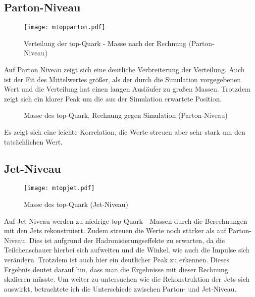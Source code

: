 \documentclass[
a4paper,                                %
twoside,                                %
BCOR1.4cm,                      %
ngerman,                                %
10pt,                           %
headings=normal,                %
headsepline,                    %
clearplainpage, %
final,                                  %
div=14,
parskip=full
]{scrbook}
\begin{document}
\newpage

\subsection{Parton-Niveau}

\begin{figure}[h]
	\centering
	\texttt{[image: mtopparton.pdf]}
	\caption{Verteilung der top-Quark - Masse nach der Rechnung (Parton-Niveau)}
\end{figure}

Auf Parton Niveau zeigt sich eine deutliche Verbreiterung der Verteilung. Auch ist der Fit des Mittelwertes gr\"o\ss er, als der durch die Simulation vorgegebenen Wert und die Verteilung hat einen langen Ausl\"aufer zu gro\ss en Massen. Trotzdem zeigt sich ein klarer Peak um die aus der Simulation erwartete Position.

\begin{figure}[h]
    \caption{Masse des top-Quark, Rechnung gegen Simulation (Parton-Niveau)}
    \label{topmassepartonhist}
\end{figure}

Es zeigt sich eine leichte Korrelation, die Werte streuen aber sehr stark um den tats\"achlichen Wert.

\newpage

\subsection{Jet-Niveau}

\begin{figure}[h]
	\centering
    \texttt{[image: mtopjet.pdf]}
    \caption{Masse des top-Quark (Jet-Niveau)}
    \label{topmassejethist}
\end{figure}

Auf Jet-Niveau werden zu niedrige top-Quark - Massen durch die Berechnungen mit den Jets rekonstruiert. Zudem streuen die Werte noch st\"arker als auf Parton-Niveau. Dies ist aufgrund der Hadronisierungseffekte zu erwarten, da die Teilchenschauer hierbei sich aufweiten und die Winkel, wie auch die Impulse sich ver\"andern. Trotzdem ist auch hier ein deutlicher Peak zu erkennen. Dieses Ergebnis deutet darauf hin, dass man die Ergebnisse mit dieser Rechnung skalieren m\"usste. Um weiter zu untersuchen wie die Rekonstruktion der Jets sich auswirkt, betrachtete ich die Unterschiede zwischen Parton- und Jet-Niveau.
\end{document}
